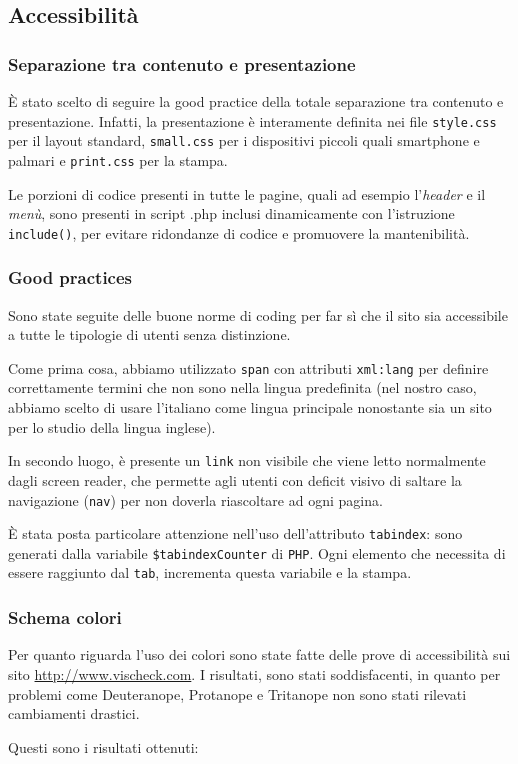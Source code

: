 \documentclass[12pt, a4paper]{article}
\newcommand*{\egrave}{\MakeUppercase{è} }
\begin{document}
\subsection{Accessibilità}

\subsubsection{Separazione tra contenuto e presentazione}
\egrave stato scelto di seguire la good practice della totale separazione tra 
contenuto e presentazione. Infatti, la presentazione è interamente 
definita nei file \texttt{style.css} per il layout standard, \texttt{small.css}
per i dispositivi piccoli quali smartphone e palmari e \texttt{print.css} per la stampa.\par
Le porzioni di codice presenti in tutte le pagine, quali ad esempio l’\emph{header} e il \emph{menù}, sono presenti in script .php inclusi dinamicamente con l'istruzione \texttt{\mbox{include()}}, per evitare ridondanze di codice e promuovere la mantenibilità.

\subsubsection{Good practices}
Sono state seguite delle buone norme di coding per far sì che il sito sia accessibile a 
tutte le tipologie di utenti senza distinzione. \par
Come prima cosa, abbiamo utilizzato \texttt{span} con attributi \texttt{xml:lang} per definire correttamente termini che non sono nella lingua predefinita (nel nostro caso, abbiamo scelto di usare l'italiano come lingua principale nonostante sia un sito per 
lo studio della lingua inglese). \par
In secondo luogo, è presente un \texttt{link} non visibile che viene letto 
normalmente dagli screen reader, che permette agli utenti con deficit visivo di
saltare la navigazione (\texttt{nav}) per non doverla riascoltare ad ogni pagina.\par
\egrave stata posta particolare attenzione nell'uso dell'attributo \texttt{tabindex}: sono generati dalla variabile \texttt{\$tabindexCounter} di \texttt{PHP}. Ogni elemento che 
necessita di essere raggiunto dal \texttt{tab}, incrementa questa variabile e la stampa.

\subsubsection{Schema colori}
Per quanto riguarda l’uso dei colori sono state fatte delle prove di accessibilità sui sito
\mbox{\url{http://www.vischeck.com}}. I risultati, sono stati soddisfacenti, in quanto per problemi come Deuteranope, Protanope e Tritanope non sono stati rilevati cambiamenti drastici.\par
Questi sono i risultati ottenuti: \par
\end{document}
